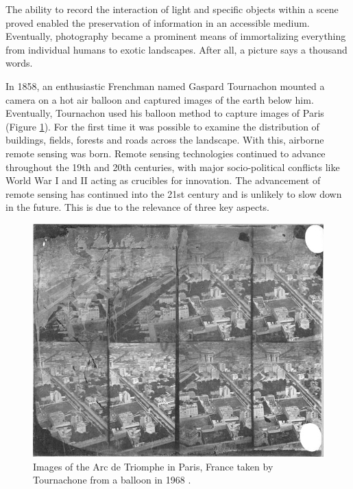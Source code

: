 \documentclass[
]{book}
\begin{document}
The ability to record the interaction of light and specific objects within a scene proved enabled the preservation of information in an accessible medium. Eventually, photography became a prominent means of immortalizing everything from individual humans to exotic landscapes. After all, a picture says a thousand words.

In 1858, an enthusiastic Frenchman named Gaspard Tournachon mounted a camera on a hot air balloon and captured images of the earth below him. Eventually, Tournachon used his balloon method to capture images of Paris (Figure \ref{fig:11-nadar}). For the first time it was possible to examine the distribution of buildings, fields, forests and roads across the landscape. With this, airborne remote sensing was born. Remote sensing technologies continued to advance throughout the 19th and 20th centuries, with major socio-political conflicts like World War I and II acting as crucibles for innovation. The advancement of remote sensing has continued into the 21st century and is unlikely to slow down in the future. This is due to the relevance of three key aspects.



\begin{figure}
\includegraphics[width=0.75\linewidth]{images/11-nadar-triomphe-1868} \caption{Images of the Arc de Triomphe in Paris, France taken by Tournachone from a balloon in 1968 \citep{nadar_arc_1868}.}\label{fig:11-nadar}
\end{figure}
\end{document}
